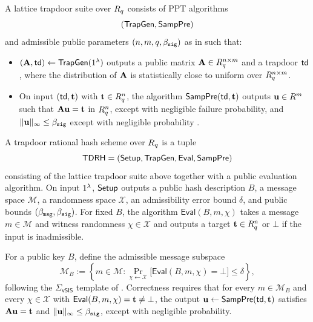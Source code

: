 \begin{definition}\label{def:trapdoor-suite}
A lattice trapdoor suite over \(R_q\) consists of PPT algorithms
\[
  (\mathsf{TrapGen},\mathsf{SampPre})
\]
and admissible public parameters \((n,m,q,\beta_{\mathtt{sig}})\) as in \cite[Definition~1]{EPRINT:DKLW25} such that:
\begin{itemize}[leftmargin=1.25em]
  \item \((\mathbf{A},\mathsf{td})\gets \mathsf{TrapGen}(1^\lambda)\) outputs a public matrix \(\mathbf{A}\in R_q^{n\times m}\) and a trapdoor
  \(\mathsf{td}\), where the distribution of \(\mathbf{A}\) is statistically close to uniform over \(R_q^{n\times m}\).
  \item On input \((\mathsf{td},\mathbf{t})\) with \(\mathbf{t}\in R_q^n\), the algorithm \(\mathsf{SampPre}(\mathsf{td},\mathbf{t})\) outputs
  \(\mathbf{u}\in R^m\) such that \(\mathbf{A}\mathbf{u}=\mathbf{t}\) in \(R_q^n\), except with negligible failure probability, and
  \(\|\mathbf{u}\|_\infty\le \beta_{\mathtt{sig}}\) except with negligible probability
  \cite{STOC:GenPeiVai08,EPRINT:DKLW25}.
\end{itemize}
\end{definition}

\begin{definition}\label{def:bbs-rational-hash}
A trapdoor rational hash scheme over \(R_q\) is a tuple
\[
  \mathsf{TDRH}=(\mathsf{Setup},\mathsf{TrapGen},\mathsf{Eval},\mathsf{SampPre})
\]
consisting of the lattice trapdoor suite above together with a public evaluation algorithm. On input \(1^\lambda\),
\(\mathsf{Setup}\) outputs a public hash description \(B\), a message space \(\mathcal{M}\), a randomness space \(\mathcal{X}\), an
admissibility error bound \(\delta\), and public bounds \((\beta_{\mathtt{msg}},\beta_{\mathtt{sig}})\). For fixed \(B\), the algorithm
\(\mathsf{Eval}(B,m,\chi)\) takes a message \(m\in\mathcal{M}\) and witness randomness \(\chi\in\mathcal{X}\) and outputs a
target \(\mathbf{t}\in R_q^n\) or \(\bot\) if the input is inadmissible.

For a public key \(B\), define the admissible message subspace
\[
  \mathcal{M}_B:=\left\{m\in\mathcal{M} :
  \Pr_{\chi\gets \mathcal{X}}\big[\mathsf{Eval}(B,m,\chi)=\bot\big]\le \delta\right\},
\]
following the \(\Sigma_{\mathsf{vSIS}}\) template of \cite[Section~4.1]{EPRINT:DKLW25}. Correctness requires that for
every \(m\in\mathcal{M}_B\) and every \(\chi\in\mathcal{X}\) with \(\mathsf{Eval}(B,m,\chi)=\mathbf{t}\neq\bot\), the output
\(\mathbf{u}\gets \mathsf{SampPre}(\mathsf{td},\mathbf{t})\) satisfies \(\mathbf{A}\mathbf{u}=\mathbf{t}\) and \(\|\mathbf{u}\|_\infty\le \beta_{\mathtt{sig}}\), except with
negligible probability.
\end{definition}

